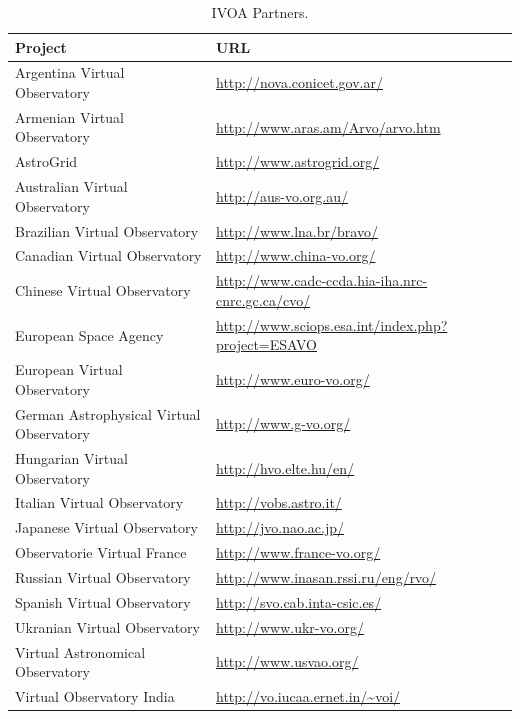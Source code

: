 \begin{table}%
\centering
\begin{tabular}{|p{7cm} | p{7cm}|}
	\hline
	\textbf{Project} & \textbf{URL} \\
	\hline
	Argentina Virtual Observatory & \url{http://nova.conicet.gov.ar/} \\
	\hline
	Armenian Virtual Observatory & \url{http://www.aras.am/Arvo/arvo.htm} \\
	\hline
	AstroGrid & \url{http://www.astrogrid.org/} \\
	\hline
	Australian Virtual Observatory & \url{http://aus-vo.org.au/} \\
	\hline
	Brazilian Virtual Observatory & \url{http://www.lna.br/bravo/} \\
	\hline
	Canadian Virtual Observatory & \url{http://www.china-vo.org/} \\
	\hline
	Chinese Virtual Observatory & \url{http://www.cadc-ccda.hia-iha.nrc-cnrc.gc.ca/cvo/} \\
	\hline
	European Space Agency & \url{http://www.sciops.esa.int/index.php?project=ESAVO} \\
	\hline
	European Virtual Observatory & \url{http://www.euro-vo.org/} \\
	\hline
	German Astrophysical Virtual Observatory & \url{http://www.g-vo.org/} \\
	\hline
	Hungarian Virtual Observatory & \url{http://hvo.elte.hu/en/} \\
	\hline
	Italian Virtual Observatory & \url{http://vobs.astro.it/} \\
	\hline
	Japanese Virtual Observatory & \url{http://jvo.nao.ac.jp/}\\
	\hline
	Observatorie Virtual France & \url{http://www.france-vo.org/} \\
	\hline
	Russian Virtual Observatory & \url{http://www.inasan.rssi.ru/eng/rvo/} \\
	\hline
	Spanish Virtual Observatory & \url{http://svo.cab.inta-csic.es/} \\
	\hline
	Ukranian Virtual Observatory & \url{http://www.ukr-vo.org/} \\
	\hline
	Virtual Astronomical Observatory & \url{http://www.usvao.org/} \\
	\hline
	Virtual Observatory India & \url{http://vo.iucaa.ernet.in/~voi/} \\
	\hline
\end{tabular}
\caption{IVOA Partners.}
\label{table:partners}
\end{table}

